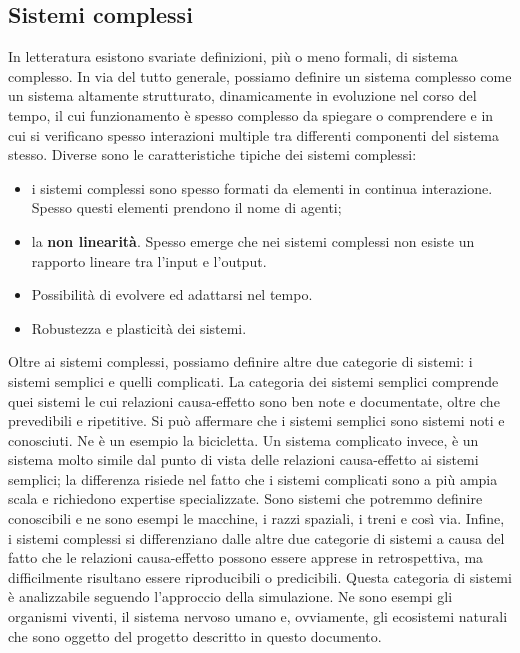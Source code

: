 \documentclass[11pt]{article}
\begin{document}
\subsection{Sistemi complessi}
In letteratura esistono svariate definizioni, più o meno formali, di sistema complesso. In via del tutto generale, possiamo definire un sistema complesso come un sistema altamente strutturato, dinamicamente in evoluzione nel corso del tempo, il cui funzionamento è spesso complesso da spiegare o comprendere e in cui si verificano spesso interazioni multiple tra differenti componenti del sistema stesso. Diverse sono le caratteristiche tipiche dei sistemi complessi: 
\begin{itemize}
    \item i sistemi complessi sono spesso formati da elementi in continua interazione. Spesso questi elementi prendono il nome di agenti;
    \item la \textbf{non linearità}. Spesso emerge che nei sistemi complessi non esiste un rapporto lineare tra l'input e l'output.
    \item Possibilità di evolvere ed adattarsi nel tempo. 
    \item Robustezza e plasticità dei sistemi. 
\end{itemize}
Oltre ai sistemi complessi, possiamo definire altre due categorie di sistemi: i sistemi semplici e quelli complicati. La categoria dei sistemi semplici comprende quei sistemi le cui relazioni causa-effetto sono ben note e documentate, oltre che prevedibili e ripetitive. Si può affermare che i sistemi semplici sono sistemi noti e conosciuti. Ne è un esempio la bicicletta. Un sistema complicato invece, è un sistema molto simile dal punto di vista delle relazioni causa-effetto ai sistemi semplici; la differenza risiede nel fatto che i sistemi complicati sono a più ampia scala e richiedono expertise specializzate. Sono sistemi che potremmo definire conoscibili e ne sono esempi le macchine, i razzi spaziali, i treni e così via. Infine, i sistemi complessi si differenziano dalle altre due categorie di sistemi a causa del fatto che le relazioni causa-effetto possono essere apprese in retrospettiva, ma difficilmente risultano essere riproducibili o predicibili. Questa categoria di sistemi è analizzabile seguendo l'approccio della simulazione. Ne sono esempi gli organismi viventi, il sistema nervoso umano e, ovviamente, gli ecosistemi naturali che sono oggetto del progetto descritto in questo documento. 
\end{document}

